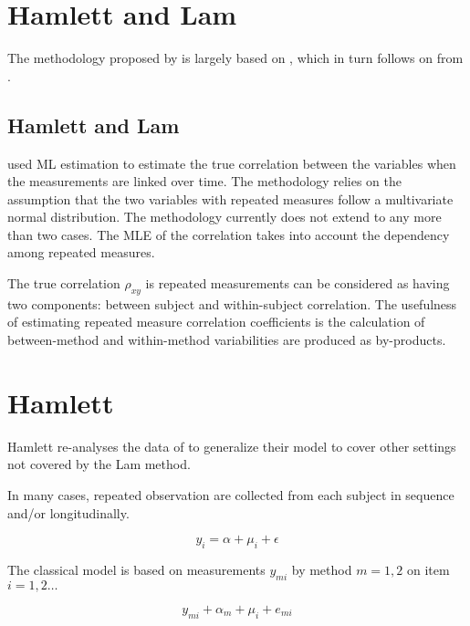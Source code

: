 \documentclass[MAIN.tex]{subfiles}
\begin{document}
	
	\section{Hamlett and Lam}
	The methodology proposed by \citet{Roy2009} is largely based on \citet{hamlett}, which in turn follows on from \citet{lam}.
	
	
	
	
	
	
	

	

	
\subsection*{Hamlett and Lam}
\citet{Lam} used ML estimation to estimate the true correlation between the variables when
the measurements are linked over time. The methodology relies on the assumption that the two variables with repeated measures follow a multivariate normal distribution. The methodology currently does not extend to any more than two cases. The MLE of the correlation takes into account the dependency among repeated measures.

The true correlation $\rho_{xy}$ is repeated measurements can be considered as having two components: between subject and within-subject correlation. The usefulness of estimating repeated measure correlation coefficients is the calculation of between-method and within-method variabilities are produced as by-products.


\section{Hamlett}
Hamlett re-analyses the data of \citet{Lam} to generalize their model to cover other settings not covered by the Lam method.

In many cases, repeated observation are collected from each subject in sequence  and/or longitudinally.


\[ y_i = \alpha + \mu_i + \epsilon \]

The classical model is based on measurements $y_{mi}$
by method $m=1,2$ on item $i = 1,2 \ldots$

\[y_{mi} + \alpha_{m} + \mu_{i} + e_{mi}\]
\end{document}
